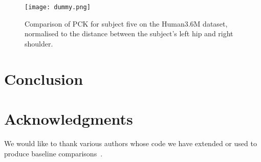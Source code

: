 \documentclass[runningheads]{llncs}
\newif\ifaccvfinal{}
\begin{document}
\begin{figure}[t]
\begin{center}
\texttt{[image: dummy.png]}
\end{center}
\caption{Comparison of PCK for subject five on the Human3.6M dataset, normalised
to the distance between the subject's left hip and right shoulder.}
\label{fig:h36m-pckh}
\end{figure}



\section{Conclusion}

\section*{Acknowledgments}

We would like to thank various authors whose code we have extended or used to
produce baseline
comparisons~\cite{pfister2015flowing,chen2014articulated,cherian2014mixing}.




\end{document}
